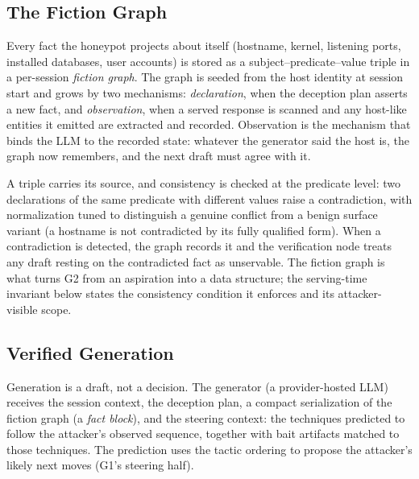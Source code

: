 \subsection{The Fiction Graph}
\label{sec:graph}
Every fact the honeypot projects about itself (hostname, kernel, listening
ports, installed databases, user accounts) is stored as a
subject--predicate--value triple in a per-session \emph{fiction graph}.
The graph is seeded from the host identity at session start and grows by
two mechanisms: \emph{declaration}, when the deception plan asserts a new
fact, and \emph{observation}, when a served response is scanned and any
host-like entities it emitted are extracted and recorded. Observation is
the mechanism that binds the LLM to the recorded state: whatever the generator said the
host is, the graph now remembers, and the next draft must agree with it.

A triple carries its source, and consistency is checked at the predicate
level: two declarations of the same predicate with different values raise
a contradiction, with normalization tuned to distinguish a genuine
conflict from a benign surface variant (a hostname is not contradicted by
its fully qualified form). When a contradiction is detected, the graph
records it and the verification node treats any draft resting on the
contradicted fact as unservable. The fiction graph is what turns G2 from
an aspiration into a data structure; the serving-time invariant below
states the consistency condition it enforces and its attacker-visible
scope.

\subsection{Verified Generation}
\label{sec:verify}
Generation is a draft, not a decision. The generator (a provider-hosted
LLM) receives the session context, the deception plan, a compact
serialization of the fiction graph (a \emph{fact block}), and the
steering context: the \attck techniques predicted to follow the
attacker's observed sequence, together with bait artifacts matched to
those techniques. The prediction uses the \attck tactic ordering to
propose the attacker's likely next moves (G1's steering half).

